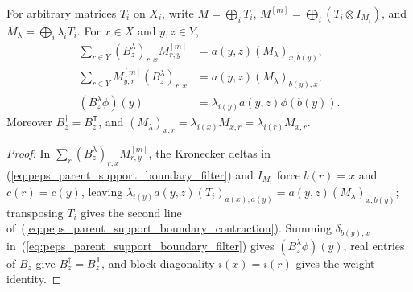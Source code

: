\begin{lemma}%
    \label{thm:peps_parent_support_boundary_factors}
    \leanok
    For arbitrary matrices $T_i$ on $X_i$, write
    $M=\bigoplus_iT_i$, $M^{[m]}=\bigoplus_i(T_i\otimes I_{M_i})$,
    and $M_\lambda=\bigoplus_i\lambda_iT_i$.
    For $x\in X$ and $y,z\in Y$,
    \begin{align}
        \sum_{r\in Y}(B_z^\lambda)_{r,x}M^{[m]}_{r,y}
         & =a(y,z)(M_\lambda)_{x,b(y)},                     \\
        \sum_{r\in Y}M^{[m]}_{y,r}(B_z^\lambda)_{r,x}
         & =a(y,z)(M_\lambda)_{b(y),x},
        \label{eq:peps_parent_support_boundary_contraction} \\
        (B_z^\lambda\phi)(y)
         & =\lambda_{i(y)}a(y,z)\phi(b(y)).
    \end{align}
    Moreover $B_z^\dagger=B_z^{\mathsf T}$, and
    $(M_\lambda)_{x,r}=\lambda_{i(x)}M_{x,r}=\lambda_{i(r)}M_{x,r}$.
\end{lemma}
\begin{proof}\leanok
    In $\sum_r(B_z^\lambda)_{r,x}M^{[m]}_{r,y}$, the Kronecker deltas in
    (\ref{eq:peps_parent_support_boundary_filter}) and $I_{M_i}$ force
    $b(r)=x$ and $c(r)=c(y)$, leaving $\lambda_{i(y)}a(y,z)(T_i)_{a(x),a(y)}=a(y,z)(M_\lambda)_{x,b(y)}$;
    transposing $T_i$ gives the second line of~(\ref{eq:peps_parent_support_boundary_contraction}).
    Summing $\delta_{b(y),x}$ in~(\ref{eq:peps_parent_support_boundary_filter})
    gives $(B_z^\lambda\phi)(y)$, real entries of $B_z$ give
    $B_z^\dagger=B_z^{\mathsf T}$, and block diagonality $i(x)=i(r)$ gives the
    weight identity.
\end{proof}

